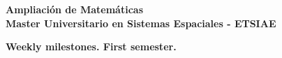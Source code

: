 \documentclass[12pt, a4paper]{article}
\begin{document}
\begin{center}
	{\bf 
	Ampliación de Matemáticas} \\
	{\bf Master Universitario en Sistemas Espaciales - 
	ETSIAE}                                                                                                             
	               \\
\end{center}

\vspace{1cm}


\pagestyle{empty}

\noindent
{\bf \Large Weekly milestones. First semester.  
}                                                                               
     \\

\vspace{-0.5cm}
\end{document}
